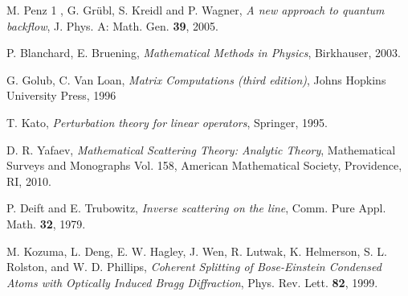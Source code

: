 \documentclass[11pt,a4paper,twoside,openany]{book}
\begin{document}
\begin{thebibliography}{50}
	M. Penz 1 , G. Gr\"{u}bl, S. Kreidl and P. Wagner,
	\textit{A new approach to quantum backflow},
	J. Phys. A: Math. Gen. \textbf{39},
	2005.
	
	P. Blanchard, E. Bruening,
	\textit{Mathematical Methods in Physics}, 
	Birkhauser,
	2003. 
	
	G. Golub, C. Van Loan,
	\textit{Matrix Computations (third edition)},
	Johns Hopkins University Press,
	1996
	
	T. Kato,
	\textit{Perturbation theory for linear operators},
	Springer,
	1995.
	
	D. R. Yafaev,
	\textit{Mathematical Scattering Theory: Analytic Theory},
	Mathematical Surveys and Monographs Vol. 158,
	American Mathematical Society, Providence, RI,
	2010.
	
	P. Deift and E. Trubowitz,
	\textit{Inverse scattering on the line},
	Comm. Pure Appl. Math. \textbf{32},
	1979.
	
	M. Kozuma, L. Deng, E. W. Hagley, J. Wen, R. Lutwak, K. Helmerson, S. L. Rolston, and W. D. Phillips,
	\textit{Coherent Splitting of Bose-Einstein Condensed Atoms with Optically Induced Bragg Diffraction},
	Phys. Rev. Lett. \textbf{82},
	1999.
	
	
\end{thebibliography}



  
		
	
\end{document}
